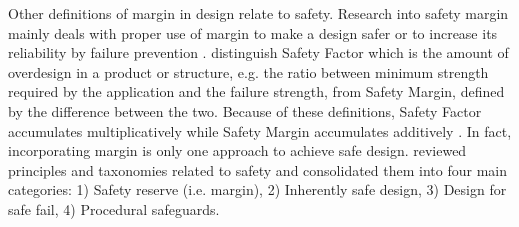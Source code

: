 Other definitions of margin in design relate to safety. Research into safety margin mainly deals with proper use of margin to make a design safer or to increase its reliability by failure prevention \citep{Iorga2012}. \cite{Hammer1980} distinguish Safety Factor which is the amount of overdesign in a product or structure, e.g. the ratio between minimum strength required by the application and the failure strength, from Safety Margin, defined by the difference between the two. Because of these definitions, Safety Factor accumulates multiplicatively while Safety Margin accumulates additively \citep{Moller2008}. In fact, incorporating margin is only one approach to achieve safe design. \cite{Moller2008} reviewed principles and taxonomies related to safety and consolidated them into four main categories: 1) Safety reserve (i.e. margin), 2) Inherently safe design, 3) Design for safe fail, 4) Procedural safeguards. 

